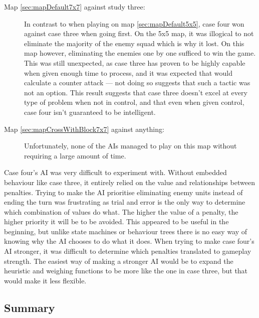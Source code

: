 \documentclass[11pt, a4paper]{report}
\begin{document}
\begin{description}
\item[Map \ref{sec:mapDefault7x7} against study three:] In contrast to when playing on map \ref{sec:mapDefault5x5}, case four won against case three when going first. On the 5x5 map, it was illogical to not eliminate the majority of the enemy squad which is why it lost. On this map however, eliminating the enemies one by one sufficed to win the game. This was still unexpected, as case three has proven to be highly capable when given enough time to process, and it was expected that would calculate a counter attack --- not doing so suggests that such a tactic was not an option. This result suggests that case three doesn't excel at every type of problem when not in control, and that even when given control, case four isn't guaranteed to be intelligent.

\item[Map \ref{sec:mapCrossWithBlock7x7} against anything:] Unfortunately, none of the AIs managed to play on this map without requiring a large amount of time. 

\end{description}

Case four's AI was very difficult to experiment with. Without embedded behaviour like case three, it entirely relied on the value and relationships between penalties. Trying to make the AI prioritise eliminating enemy units instead of ending the turn was frustrating as trial and error is the only way to determine which combination of values do what. The higher the value of a penalty, the higher priority it will be to be avoided. This appeared to be useful in the beginning, but unlike state machines or behaviour trees there is no easy way of knowing why the AI chooses to do what it does. When trying to make case four's AI stronger, it was difficult to determine which penalties translated to gameplay strength. The easiest way of making a stronger AI would be to expand the heuristic and weighing functions to be more like the one in case three, but that would make it less flexible.

\subsection{Summary}
\label{subsec:summaryOfCaseStudies}
\end{document}
